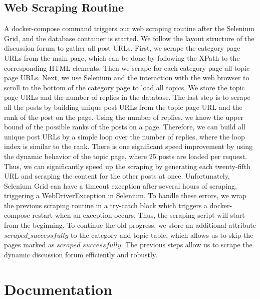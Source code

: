 \subsection{Web Scraping Routine}\label{subsec:web-scraping-routine}
A docker-compose command triggers our web scraping routine after the Selenium Grid, and the database container is started.
We follow the layout structure of the discussion forum to gather all post \ac{URL}s.
First, we scrape the category page \ac{URL}s from the main page, which can be done by following the XPath to the corresponding \ac{HTML} elements.
Then we scrape for each category page all topic page URLs. Next, we use Selenium and the interaction with the web browser to scroll to the bottom of the category page to load all topics.
We store the topic page \ac{URL}s and the number of replies in the database.
The last step is to scrape all the posts by building unique post \ac{URL}s from the topic page \ac{URL} and the rank of the post on the page.
Using the number of replies, we know the upper bound of the possible ranks of the posts on a page.
Therefore, we can build all unique post \ac{URL}s by a simple loop over the number of replies, where the loop index is similar to the rank.
There is one significant speed improvement by using the dynamic behavior of the topic page, where 25 posts are loaded per request.
Thus, we can significantly speed up the scraping by generating each twenty-fifth \ac{URL} and scraping the content for the other posts at once.
Unfortunately, Selenium Grid can have a timeout exception after several hours of scraping, triggering a WebDriverException in Selenium.
To handle these errors, we wrap the previous scraping routine in a try-catch block which triggers a docker-compose restart when an exception occurs.
Thus, the scraping script will start from the beginning.
To continue the old progress, we store an additional attribute $scraped\_successfully$ to the category and topic table, which allows us to skip the pages marked as $scraped\_successfully$.
The previous steps allow us to scrape the dynamic discussion forum efficiently and robustly.


\section{Documentation}\label{sec:documentation}

